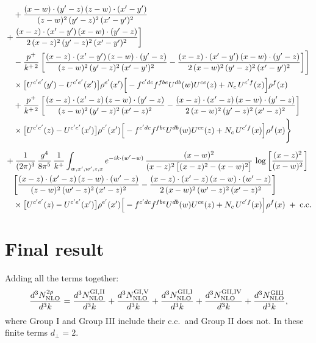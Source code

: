 \documentclass[9pt]{article}
\numberwithin{equation}{section}
\begin{document}
\begin{align}
&\quad +\frac{(x-w)\cdot(y^{\prime}-z)\,(z-w)\cdot(x^{\prime}-y^{\prime})}{(z-w)^{2}\,(y^{\prime}-z)^{2}\,(x^{\prime}-y^{\prime})^{2}} \notag \\ & +\frac{(x-z)\cdot(x^{\prime}-y^{\prime})\,(x-w)\cdot(y^{\prime}-z)}{2\,(x-z)^{2}\,(y^{\prime}-z)^{2}\,(x^{\prime}-y^{\prime})^{2}}\bigg]\notag\\&\quad-\frac{p^{+}}{k^{+\,2}}\,\bigg[\frac{(x-z)\cdot(x^{\prime}-y^{\prime})\,(z-w)\cdot(y^{\prime}-z)}{(z-w)^{2}\,(y^{\prime}-z)^{2}\,(x^{\prime}-y^{\prime})^{2}} -\frac{(x-z)\cdot(x^{\prime}-y^{\prime})\,(x-w)\cdot(y^{\prime}-z)}{2\,(x-w)^{2}\,(y^{\prime}-z)^{2}\,(x^{\prime}-y^{\prime})^{2}}\bigg]\Bigg]\notag\\&\quad\times\big[U^{c^{\prime}e^{\prime}}(y^{\prime})-U^{c^{\prime}e^{\prime}}(x^{\prime})\big]\rho^{e^{\prime}}(x^{\prime})\Big[-f^{c^{\prime}dc}f^{fbe}U^{db}(w)U^{ce}(z)+N_{c}\,U^{c^{\prime}f}(x)\Big]\rho^{f}(x)\notag\\&\quad+\frac{p^{+}}{k^{+\,2}}\,\bigg[\frac{(x-z)\cdot(x^{\prime}-z)\,(z-w)\cdot(y^{\prime}-z)}{(z-w)^{2}\,(y^{\prime}-z)^{2}\,(x^{\prime}-z)^{2}} -\frac{(x-z)\cdot(x^{\prime}-z)\,(x-w)\cdot(y^{\prime}-z)}{2\,(x-w)^{2}\,(y^{\prime}-z)^{2}\,(x^{\prime}-z)^{2}}\bigg]\notag\\&\quad\times\big[U^{c^{\prime}e^{\prime}}(z)-U^{c^{\prime}e^{\prime}}(x^{\prime})\big]\rho^{e^{\prime}}(x^{\prime})\Big[-f^{c^{\prime}dc}f^{fbe}U^{db}(w)U^{ce}(z)+N_{c}\,U^{c^{\prime}f}(x)\Big]\rho^{f}(x)\Bigg\}\notag\\[6pt]&+\frac{1}{(2\pi)^{3}}\,\frac{g^{4}}{8\pi^{5}}\,\frac{1}{k^{+}}\int_{w,x^{\prime},w^{\prime},z,x}e^{-ik\cdot(w^{\prime}-w)}\,\frac{(x-w)^{2}}{(x-z)^{2}\,\big[(x-z)^{2}-(x-w)^{2}\big]}\,\log\left[\frac{(x-z)^{2}}{(x-w)^{2}}\right]\notag \\&\quad   \bigg[\frac{(x-z)\cdot(x^{\prime}-z)\,(z-w)\cdot(w^{\prime}-z)}{(z-w)^{2}\,(w^{\prime}-z)^{2}\,(x^{\prime}-z)^{2}} -\frac{(x-z)\cdot(x^{\prime}-z)\,(x-w)\cdot(w^{\prime}-z)}{2\,(x-w)^{2}\,(w^{\prime}-z)^{2}\,(x^{\prime}-z)^{2}}\bigg]\notag\\&\quad\times\big[U^{c^{\prime}e^{\prime}}(z)-U^{c^{\prime}e^{\prime}}(x^{\prime})\big]\rho^{e^{\prime}}(x^{\prime})\Big[-f^{c^{\prime}dc}f^{fbe}U^{db}(w)U^{ce}(z)+N_{c}\,U^{c^{\prime}f}(x)\Big]\rho^{f}(x)\;+\;{\rm c.c.}
\end{align}
\section{Final result}
Adding all the terms together:
\begin{align}
\frac{d^{3}N^{2\rho}_{\rm NLO}}{d^{3}k}=\frac{d^{3}N^{\rm GI,II}_{\rm NLO}}{d^{3}k}+\frac{d^{3}N^{\rm GI,V}_{\rm NLO}}{d^{3}k}+\frac{d^{3}N^{\rm GII,I}_{\rm NLO}}{d^{3}k}+\frac{d^{3}N^{\rm GII,IV}_{\rm NLO}}{d^{3}k}+\frac{d^{3}N^{\rm GIII}_{\rm NLO}}{d^{3}k},
\end{align}
where Group I and Group III include their c.c.\ and Group II does not. In these finite terms $d_{\perp}=2$.
\end{document}
